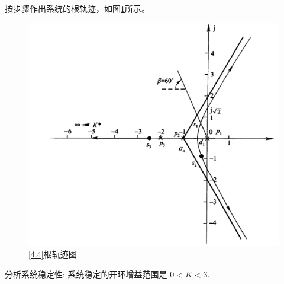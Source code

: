 按步骤作出系统的根轨迹，如图\ref{F4.4}所示。

\begin{figure}[!htb]
	\centering
	\includegraphics[width=0.62\linewidth]{pic/4.4.png}
	\vspace*{-1.2em}
	\caption{\ref{4.4}根轨迹图}
	\label{F4.4}
\end{figure}

分析系统稳定性: 系统稳定的开环增益范围是 $0<K<3$.
	
